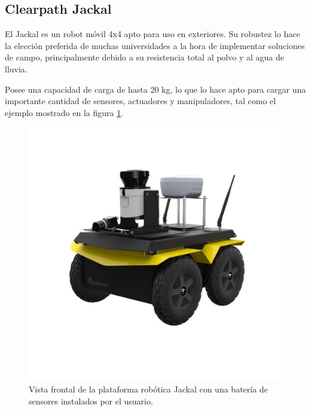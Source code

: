 
\subsection{Clearpath Jackal}

El Jackal es un robot móvil 4x4 apto para uso en exteriores. Su robustez lo hace la elección preferida de muchas universidades a la hora de implementar soluciones de campo, principalmente debido a su resistencia total al polvo y al agua de lluvia.

\newpage

Posee una capacidad de carga de hasta 20 kg, lo que lo hace apto para cargar una importante cantidad de sensores, actuadores y manipuladores, tal como el ejemplo mostrado en la figura \ref{fig:robotJackal}.

\begin{figure}[ht]
	\centering
	\includegraphics[scale=1.6]{./Figures/jackal.png}
	\caption{Vista frontal de la plataforma robótica Jackal con una batería de sensores instalados por el usuario.\protect\footnotemark}
	\label{fig:robotJackal}
\end{figure}


